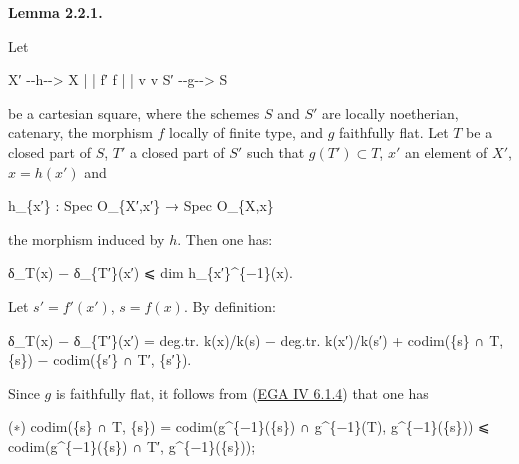 \documentclass[
  11pt,
  a4paper,
]{book}
\newenvironment{Shaded}{}{}
\newcommand{\NormalTok}[1]{#1}
\begin{document}
\textbf{Lemma 2.2.1.}

Let

\begin{Shaded}
\begin{Highlighting}[]
\NormalTok{X′ {-}{-}h{-}{-}\textgreater{} X}
\NormalTok{|         |}
\NormalTok{f′        f}
\NormalTok{|         |}
\NormalTok{v         v}
\NormalTok{S′ {-}{-}g{-}{-}\textgreater{} S}
\end{Highlighting}
\end{Shaded}

be a cartesian square, where the schemes \(S\) and \(S'\) are locally
noetherian, catenary, the morphism \(f\) locally of finite type, and
\(g\) faithfully flat. Let \(T\) be a closed part of \(S\), \(T'\) a
closed part of \(S'\) such that \(g(T')
\subset T\), \(x'\) an element of \(X'\), \(x = h(x')\) and

\begin{Shaded}
\begin{Highlighting}[]
\NormalTok{h\_\{x′\} : Spec O\_\{X′,x′\} → Spec O\_\{X,x\}}
\end{Highlighting}
\end{Shaded}

the morphism induced by \(h\). Then one has:

\begin{Shaded}
\begin{Highlighting}[]
\NormalTok{δ\_T(x) − δ\_\{T′\}(x′) ⩽ dim h\_\{x′\}\^{}\{−1\}(x).}
\end{Highlighting}
\end{Shaded}

Let \(s' = f'(x')\), \(s = f(x)\). By definition:

\begin{Shaded}
\begin{Highlighting}[]
\NormalTok{δ\_T(x) − δ\_\{T′\}(x′) = deg.tr. k(x)/k(s) − deg.tr. k(x′)/k(s′)}
\NormalTok{                     + codim(\{s\} ∩ T, \{s\}) − codim(\{s′\} ∩ T′, \{s′\}).}
\end{Highlighting}
\end{Shaded}

Since \(g\) is faithfully flat, it follows from
(\href{https://jcreinhold.github.io/ega/iv/18-ch4-06-flat-morphisms.html\#61-flatness-and-dimension}{EGA
IV 6.1.4}) that one has

\begin{Shaded}
\begin{Highlighting}[]
\NormalTok{(∗) codim(\{s\} ∩ T, \{s\}) = codim(g\^{}\{−1\}(\{s\}) ∩ g\^{}\{−1\}(T), g\^{}\{−1\}(\{s\}))}
\NormalTok{                       ⩽ codim(g\^{}\{−1\}(\{s\}) ∩ T′, g\^{}\{−1\}(\{s\}));}
\end{Highlighting}
\end{Shaded}
\end{document}
